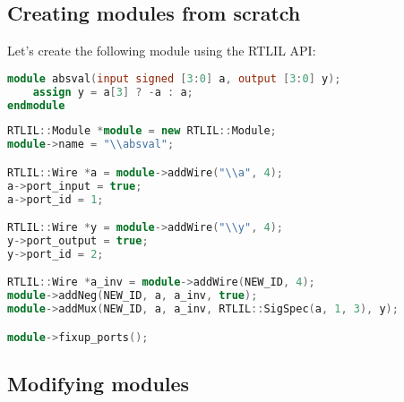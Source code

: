 
\subsection{Creating modules from scratch}

\begin{frame}[t, fragile]{\subsecname}
Let's create the following module using the RTLIL API:

\smallskip
\begin{lstlisting}[xleftmargin=1cm, basicstyle=\ttfamily\fontsize{8pt}{10pt}\selectfont, language=Verilog]
module absval(input signed [3:0] a, output [3:0] y);
    assign y = a[3] ? -a : a;
endmodule
\end{lstlisting}

\smallskip
\begin{lstlisting}[xleftmargin=1cm, basicstyle=\ttfamily\fontsize{8pt}{10pt}\selectfont, language=C++]
RTLIL::Module *module = new RTLIL::Module;
module->name = "\\absval";

RTLIL::Wire *a = module->addWire("\\a", 4);
a->port_input = true;
a->port_id = 1;

RTLIL::Wire *y = module->addWire("\\y", 4);
y->port_output = true;
y->port_id = 2;

RTLIL::Wire *a_inv = module->addWire(NEW_ID, 4);
module->addNeg(NEW_ID, a, a_inv, true);
module->addMux(NEW_ID, a, a_inv, RTLIL::SigSpec(a, 1, 3), y);

module->fixup_ports();
\end{lstlisting}
\end{frame}


\subsection{Modifying modules}

